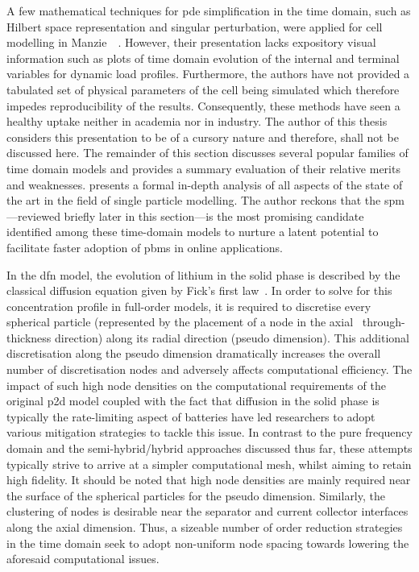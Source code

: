 A few mathematical  techniques for \gls{pde} simplification in  the time domain,
such as Hilbert space representation and singular perturbation, were applied for
cell  modelling in  Manzie~\etal~\cite{Manzie2015}. However,  their presentation
lacks expository  visual information such as  plots of time domain  evolution of
the internal and terminal variables  for dynamic load profiles. Furthermore, the
authors  have  not provided  a  tabulated  set  of  physical parameters  of  the
cell being  simulated which  therefore impedes  reproducibility of  the results.
Consequently, these methods  have seen a healthy uptake neither  in academia nor
in industry. The  author of this thesis  considers this presentation to  be of a
cursory  nature  and therefore,  shall  not  be  discussed here.  The  remainder
of  this  section discusses  several  popular  families  of time  domain  models
and  provides a  summary evaluation  of  their relative  merits and  weaknesses.
 presents a formal in-depth  analysis of all aspects of the
state of the art  in the field of single particle  modelling. The author reckons
that  the  \gls{spm}---reviewed briefly  later  in  this section---is  the  most
promising  candidate identified  among  these time-domain  models  to nurture  a
latent  potential  to  facilitate  faster  adoption  of  \glspl{pbm}  in  online
applications.



In the \gls{dfn} model, the evolution of lithium in the solid phase is described
by the classical  diffusion equation given by  Fick's first law~\cite{Fick1995}.
In order  to solve for  this concentration profile  in full-order models,  it is
required to discretise every spherical particle (represented by the placement of
a  node  in  the  axial  \ie~through-thickness  direction)  along  its  radial
direction (pseudo  dimension). This  additional discretisation along  the pseudo
dimension dramatically increases the overall  number of discretisation nodes and
adversely  affects  computational  efficiency.  The impact  of  such  high  node
densities  on the  computational requirements  of the  original \gls{p2d}  model
coupled  with the  fact  that diffusion  in  the solid  phase  is typically  the
rate-limiting  aspect  of  batteries  have  led  researchers  to  adopt  various
mitigation strategies  to tackle this issue.  In contrast to the  pure frequency
domain and the semi-hybrid/hybrid approaches  discussed thus far, these attempts
typically strive  to arrive at  a simpler  computational mesh, whilst  aiming to
retain high  fidelity. It should  be noted that  high node densities  are mainly
required near the  surface of the spherical particles for  the pseudo dimension.
Similarly, the clustering  of nodes is desirable near the  separator and current
collector interfaces along the axial dimension.
Thus, a sizeable number  of order reduction strategies in the time  domain seek
to adopt non-uniform node  spacing towards lowering the aforesaid computational
issues.

